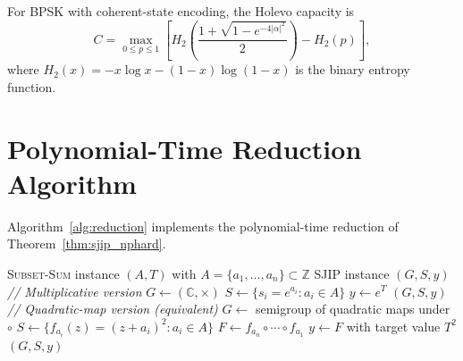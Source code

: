 \documentclass[journal,twocolumn]{IEEEtran}
\theoremstyle{definition}
\theoremstyle{plain}
\newcommand{\C}{\mathbb{C}}
\newcommand{\Z}{\mathbb{Z}}
\begin{document}
For BPSK with coherent-state encoding, the Holevo capacity is
\begin{equation}
  C = \max_{0 \le p \le 1}\!\left[
    H_2\!\left(\frac{1+\sqrt{1-e^{-4|\alpha|^2}}}{2}\right)
    - H_2(p)\right],
\end{equation}
where $H_2(x) = -x\log x - (1-x)\log(1-x)$ is the binary entropy
function.

\section{Polynomial-Time Reduction Algorithm}
\label{app:reduction}

Algorithm~\ref{alg:reduction} implements the polynomial-time
reduction of Theorem~\ref{thm:sjip_nphard}.

\begin{algorithm}[H]
\caption{Polynomial-Time Reduction: \textsc{Subset-Sum} to SJIP}
\label{alg:reduction}
\begin{algorithmic}[1]
\Require \textsc{Subset-Sum} instance $(A, T)$ with
         $A = \{a_1,\ldots,a_n\} \subset \Z$
\Ensure SJIP instance $(G, S, y)$
\State \textit{// Multiplicative version}
\State $G \leftarrow (\C, \times)$
\State $S \leftarrow \{s_i = e^{a_i} : a_i \in A\}$
\State $y \leftarrow e^T$
\Return $(G, S, y)$
\State \textit{// Quadratic-map version (equivalent)}
\State $G \leftarrow$ semigroup of quadratic maps under $\circ$
\State $S \leftarrow \{f_{a_i}(z) = (z+a_i)^2 : a_i \in A\}$
\State $F \leftarrow f_{a_n} \circ \cdots \circ f_{a_1}$
\State $y \leftarrow F$ with target value $T^2$
\Return $(G, S, y)$
\end{algorithmic}
\end{algorithm}
\end{document}
